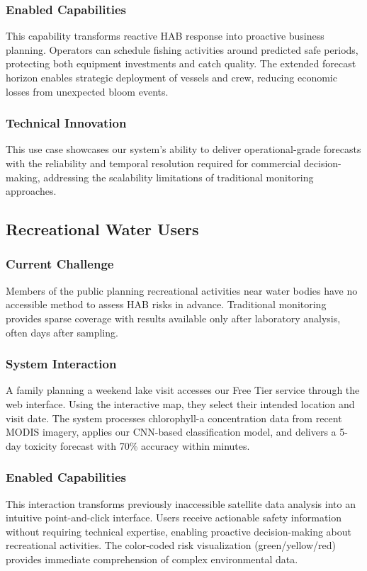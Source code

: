 \documentclass[conference]{IEEEtran}
\begin{document}
\subsubsection{Enabled Capabilities}
This capability transforms reactive HAB response into proactive business planning. Operators can schedule fishing activities around predicted safe periods, protecting both equipment investments and catch quality. The extended forecast horizon enables strategic deployment of vessels and crew, reducing economic losses from unexpected bloom events.
\subsubsection{Technical Innovation}
This use case showcases our system's ability to deliver operational-grade forecasts with the reliability and temporal resolution required for commercial decision-making, addressing the scalability limitations of traditional monitoring approaches.

\subsection{Recreational Water Users}
\subsubsection{Current Challenge}
Members of the public planning recreational activities near water bodies have no accessible method to assess HAB risks in advance. Traditional monitoring provides sparse coverage with results available only after laboratory analysis, often days after sampling.
\subsubsection{System Interaction}
A family planning a weekend lake visit accesses our Free Tier service through the web interface. Using the interactive map, they select their intended location and visit date. The system processes chlorophyll-a concentration data from recent MODIS imagery, applies our CNN-based classification model, and delivers a 5-day toxicity forecast with 70\% accuracy within minutes.
\subsubsection{Enabled Capabilities}
This interaction transforms previously inaccessible satellite data analysis into an intuitive point-and-click interface. Users receive actionable safety information without requiring technical expertise, enabling proactive decision-making about recreational activities. The color-coded risk visualization (green/yellow/red) provides immediate comprehension of complex environmental data.
\end{document}
